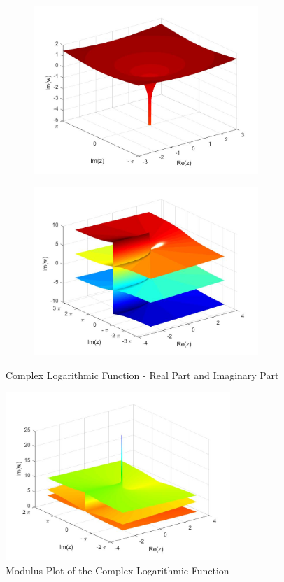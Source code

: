\documentclass[a4paper,11pt]{article}
\begin{document}
\begin{figure}[!h]
\begin{subfigure}[c]{0.5\textwidth}
\includegraphics[width=8.5cm]{plot1_log.jpeg}
\end{subfigure}
\begin{subfigure}[c]{0.5\textwidth}
\includegraphics[width=8.5cm]{plot2_log.jpeg}
\end{subfigure}
\caption{Complex Logarithmic Function - Real Part and Imaginary Part}
\label{logrealimag}
\end{figure}

\begin{figure}[!h]
\begin{center}
\includegraphics[width=8.5cm]{plot6_log.jpeg}
\caption{Modulus Plot of the Complex Logarithmic Function}
\label{logmod}
\end{center}
\end{figure}
\end{document}
